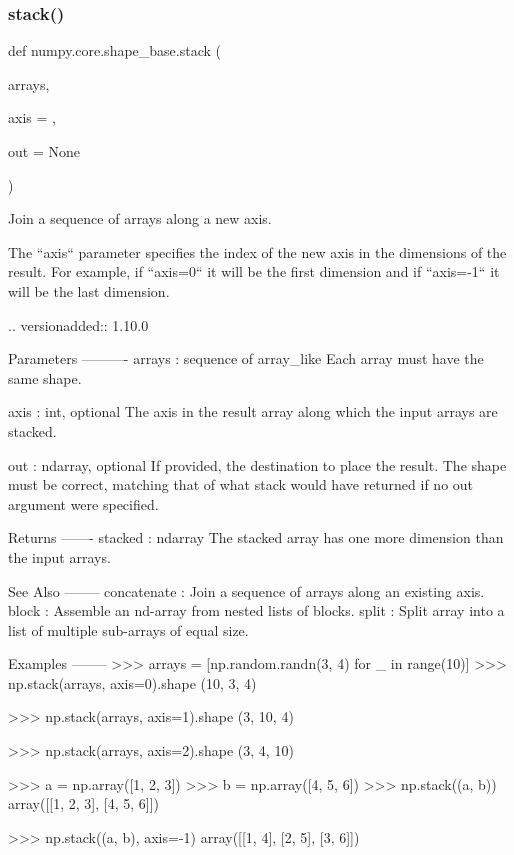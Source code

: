 \subsubsection{\texorpdfstring{stack()}{stack()}}
{\footnotesize\ttfamily def numpy.\+core.\+shape\+\_\+base.\+stack (\begin{DoxyParamCaption}\item[{}]{arrays,  }\item[{}]{axis = {},  }\item[{}]{out = {\ttfamily None} }\end{DoxyParamCaption})}

\begin{DoxyVerb}Join a sequence of arrays along a new axis.

The ``axis`` parameter specifies the index of the new axis in the
dimensions of the result. For example, if ``axis=0`` it will be the first
dimension and if ``axis=-1`` it will be the last dimension.

.. versionadded:: 1.10.0

Parameters
----------
arrays : sequence of array_like
    Each array must have the same shape.

axis : int, optional
    The axis in the result array along which the input arrays are stacked.

out : ndarray, optional
    If provided, the destination to place the result. The shape must be
    correct, matching that of what stack would have returned if no
    out argument were specified.

Returns
-------
stacked : ndarray
    The stacked array has one more dimension than the input arrays.

See Also
--------
concatenate : Join a sequence of arrays along an existing axis.
block : Assemble an nd-array from nested lists of blocks.
split : Split array into a list of multiple sub-arrays of equal size.

Examples
--------
>>> arrays = [np.random.randn(3, 4) for _ in range(10)]
>>> np.stack(arrays, axis=0).shape
(10, 3, 4)

>>> np.stack(arrays, axis=1).shape
(3, 10, 4)

>>> np.stack(arrays, axis=2).shape
(3, 4, 10)

>>> a = np.array([1, 2, 3])
>>> b = np.array([4, 5, 6])
>>> np.stack((a, b))
array([[1, 2, 3],
       [4, 5, 6]])

>>> np.stack((a, b), axis=-1)
array([[1, 4],
       [2, 5],
       [3, 6]])\end{DoxyVerb}
 \mbox{\label{namespacenumpy_1_1core_1_1shape__base_ac4d4dcd747c6e7b4918d01a365ead571}} 
